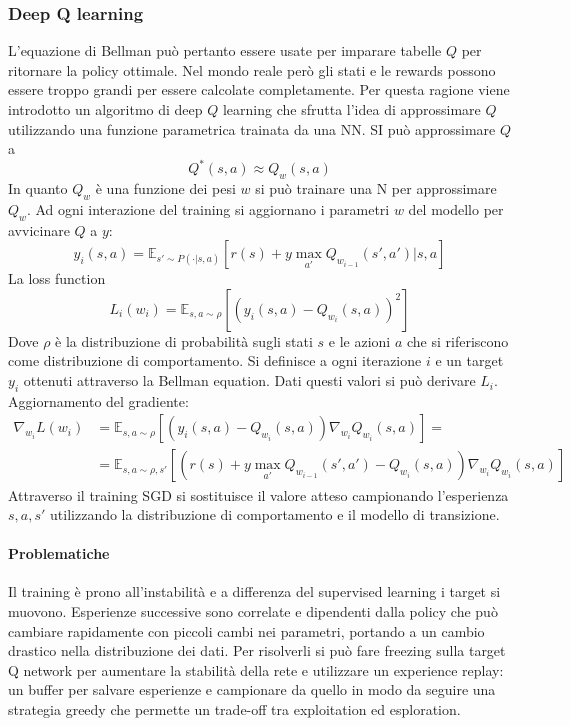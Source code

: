 		\subsubsection{Deep Q learning}
		L'equazione di Bellman pu\`o pertanto essere usate per imparare tabelle $Q$ per ritornare la policy ottimale.
		Nel mondo reale per\`o gli stati e le rewards possono essere troppo grandi per essere calcolate completamente.
		Per questa ragione viene introdotto un algoritmo di deep $Q$ learning che sfrutta l'idea di approssimare $Q$ utilizzando una funzione parametrica trainata da una NN.
		SI pu\`o approssimare $Q$ a
		$$Q^*(s,a) \approx Q_w(s,a)$$
		In quanto $Q_w$ \`e una funzione dei pesi $w$ si pu\`o trainare una N per approssimare $Q_w$.
		Ad ogni interazione del training si aggiornano i parametri $w$ del modello per avvicinare $Q$ a $y$:
		$$y_i(s,a) = \mathbb{E}_{s'\sim P(\cdot|s,a)}[r(s)+y\max_{a'}Q_{w_{i-1}}(s',a')|s,a]$$
		La loss function
		$$L_i(w_i) = \mathbb{E}_{s,a\sim \rho}[(y_i(s,a) - Q_{w_i}(s,a))^2]$$
		Dove $\rho$ \`e la distribuzione di probabilit\`a sugli stati $s$ e le azioni $a$ che si riferiscono come distribuzione di comportamento.
		Si definisce a ogni iterazione $i$ e un target $y_i$ ottenuti attraverso la Bellman equation.
		Dati questi valori si pu\`o derivare $L_i$.
		Aggiornamento del gradiente:
		\begin{align*}
			\nabla_{w_i}L(w_i) &= \mathbb{E}_{s,a\sim\rho}[(y_i(s,a) - Q_{w_i}(s,a))\nabla_{w_i}Q_{w_i}(s,a)]=\\
								  &= \mathbb{E}_{s,a\sim\rho,s'}[(r(s) + y\max_{a'}Q_{w_{i-1}}(s',a')-Q_{w_i}(s,a))\nabla_{w_i}Q_{w_i}(s,a)]
		\end{align*}
		Attraverso il training SGD si sostituisce il valore atteso campionando l'esperienza $s,a,s'$ utilizzando la distribuzione di comportamento e il modello di transizione.

			\paragraph{Problematiche}
			Il training \`e prono all'instabilit\`a e a differenza del supervised learning i target si muovono.
			Esperienze successive sono correlate e dipendenti dalla policy che pu\`o cambiare rapidamente con piccoli cambi nei parametri, portando a un cambio drastico nella distribuzione dei dati.
			Per risolverli si pu\`o fare freezing sulla target Q network per aumentare la stabilit\`a della rete e utilizzare un experience replay: un buffer per salvare esperienze e campionare da quello in modo da seguire una strategia greedy che permette un trade-off tra exploitation ed esploration.

